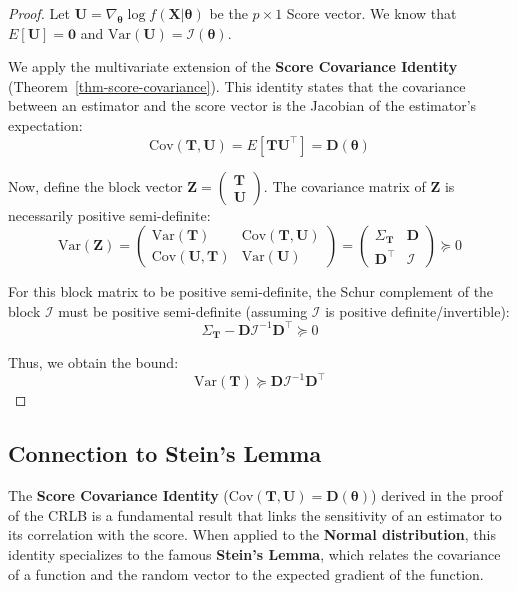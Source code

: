\documentclass[
  letterpaper,
  DIV=11,
  numbers=noendperiod]{scrreprt}
\renewcommand{\[}{\begin{equation}}
\renewcommand{\]}{\end{equation}}
\theoremstyle{definition}
\theoremstyle{plain}
\theoremstyle{plain}
\theoremstyle{plain}
\theoremstyle{definition}
\theoremstyle{plain}
\theoremstyle{remark}
\begin{document}
\begin{proof}
Let
\(\mathbf{U} = \nabla_{\boldsymbol{\theta}} \log f(\mathbf{X}|\boldsymbol{\theta})\)
be the \(p \times 1\) Score vector. We know that
\(E[\mathbf{U}] = \mathbf{0}\) and
\(\text{Var}(\mathbf{U}) = \mathcal{I}(\boldsymbol{\theta})\).

We apply the multivariate extension of the \textbf{Score Covariance
Identity} (Theorem~\ref{thm-score-covariance}). This identity states
that the covariance between an estimator and the score vector is the
Jacobian of the estimator's expectation: \[
\text{Cov}(\mathbf{T}, \mathbf{U}) = E[\mathbf{T} \mathbf{U}^\top] = \mathbf{D}(\boldsymbol{\theta})
\]

Now, define the block vector
\(\mathbf{Z} = \begin{pmatrix} \mathbf{T} \\ \mathbf{U} \end{pmatrix}\).
The covariance matrix of \(\mathbf{Z}\) is necessarily positive
semi-definite: \[
\text{Var}(\mathbf{Z}) = \begin{pmatrix} \text{Var}(\mathbf{T}) & \text{Cov}(\mathbf{T}, \mathbf{U}) \\ \text{Cov}(\mathbf{U}, \mathbf{T}) & \text{Var}(\mathbf{U}) \end{pmatrix} = \begin{pmatrix} \Sigma_{\mathbf{T}} & \mathbf{D} \\ \mathbf{D}^\top & \mathcal{I} \end{pmatrix} \succeq 0
\]

For this block matrix to be positive semi-definite, the Schur complement
of the block \(\mathcal{I}\) must be positive semi-definite (assuming
\(\mathcal{I}\) is positive definite/invertible): \[
\Sigma_{\mathbf{T}} - \mathbf{D} \mathcal{I}^{-1} \mathbf{D}^\top \succeq 0
\]

Thus, we obtain the bound: \[
\text{Var}(\mathbf{T}) \succeq \mathbf{D} \mathcal{I}^{-1} \mathbf{D}^\top
\]
\end{proof}

\subsection{Connection to Stein's
Lemma}\label{connection-to-steins-lemma}

The \textbf{Score Covariance Identity}
(\(\text{Cov}(\mathbf{T}, \mathbf{U}) = \mathbf{D}(\boldsymbol{\theta})\))
derived in the proof of the CRLB is a fundamental result that links the
sensitivity of an estimator to its correlation with the score. When
applied to the \textbf{Normal distribution}, this identity specializes
to the famous \textbf{Stein's Lemma}, which relates the covariance of a
function and the random vector to the expected gradient of the function.
\end{document}

